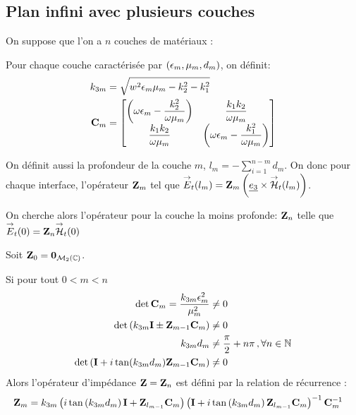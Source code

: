 \subsection{Plan infini avec plusieurs couches}
On suppose que l'on a $n$ couches de matériaux : 

\renewcommand{\z}{e_3}
\renewcommand{\x}{e_1}
\renewcommand{\y}{e_2}
\begin{figure}[h!btp]
    \centering
    \begin{tikzpicture}
        
    \end{tikzpicture}
\end{figure}

Pour chaque couche caractérisée par $(\eps_m,\mu_m,d_m)$, on définit:
\begin{align}
k_{3m} &= \sqrt{w^2\eps_m\mu_m - k_2^2 - k_1^2}
\\
\mC_m &=
    \begin{bmatrix}
        \left(\w\eps_m-\frac{k_2^2}{\w\mu_m}\right) & \frac{k_1k_2}{\w\mu_m}\\
        \frac{k_1k_2}{\w\mu_m} & \left(\w\eps_m-\frac{k_1^2}{\w\mu_m}\right)
    \end{bmatrix}
\end{align}

On définit aussi la profondeur de la couche $m$, $l_m = -\sum_{i=1}^{n-m} d_{m} $. On donc pour chaque interface, l'opérateur $\mZ_m$ tel que $\vE_t(l_m) = \mZ_m \left(\v{e_3} \times \vH_t(l_m)\right)$. 

On cherche alors l'opérateur pour la couche la moins profonde: $\mZ_n$ telle que $\vE_t(0) = \mZ_n\vH_t(0)$

\begin{thm}
    Soit $\mZ_0 = \mat{0}_{\mathcal{M}_2(\CC)}$.

    Si pour tout $0<m < n$
        \begin{align}
        \det{\mC_m} = \frac{k_{3m}\eps_m^2}{\mu_m^2} &\not = 0 \\
        \det\left(k_{3m}\mI \pm \mZ_{m-1}\mC_m \right) &\not = 0 \\
        k_{3m}d_m &\not = \frac{\pi}{2}+n\pi\,, \forall n \in \NN \\
        \det\left(\mI + i\tan(k_{3m}d_m)\mZ_{m-1}\mC_m\right) &\not = 0
    \end{align}
    Alors l'opérateur d'impédance $\mZ =  \mZ_n$ est défini par la relation de récurrence : 
    \begin{align}
    \mZ_m &= k_{3m}
    \left(i\tan\left(k_{3m}d_m\right)\mI + \mZ_{l_{m-1}}\mC_m\right)
    \left(\mI + i\tan\left(k_{3m}d_m\right)\mZ_{l_{m-1}}\mC_m\right)^{-1}
    \mC_m^{-1}
    \end{align}
\end{thm}

